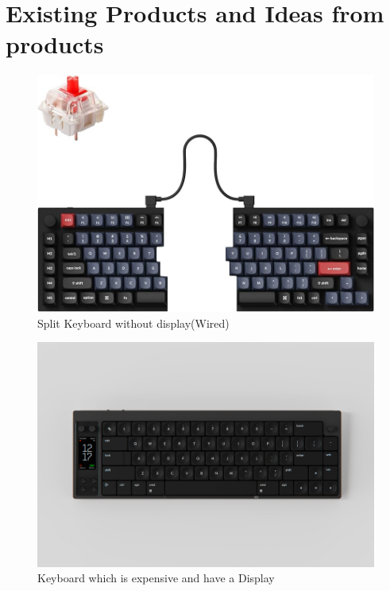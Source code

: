 \documentclass[a4paper,11pt]{article}%
\begin{document}
\section{Existing Products and Ideas from products}

\begin{figure}[H]
    \centering
    \includegraphics[scale=0.53]{figures/split_keyboard.jpg}
    \caption{Split Keyboard without display(Wired)}
\end{figure}
\vspace{0.2cm}
\begin{figure}[H]
    \centering
    \includegraphics[scale=0.26]{figures/nomad.jpg}
    \caption{Keyboard which is expensive and have a Display}
\end{figure}
\vspace{0.2cm}
\end{document}
